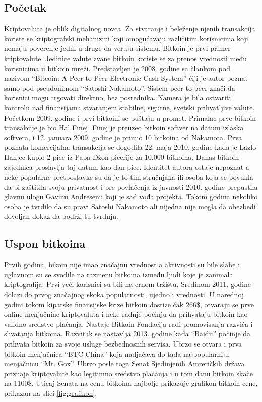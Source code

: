 \documentclass[a4paper]{article}
\begin{document}
\subsection{Početak}
Kriptovaluta je oblik digitalnog novca. Za stvaranje i beleženje njenih transakcija koriste se kriptografski mehanizmi koji omogućavaju različitim korisnicima koji nemaju poverenje jedni u druge da veruju sistemu. Bitkoin je prvi primer kriptovalute. Jedinice valute zvane bitkoin koriste  se za prenos vrednosti među korisnicima u bitkoin mreži. Predstavljen je 2008. godine sa člankom pod nazivom ``Bitcoin: A Peer-to-Peer Electronic Cash System'' čiji je autor poznat samo pod pseudonimom  ``Satoshi Nakamoto''. Sistem peer-to-peer znači da korisnici mogu trgovati direktno, bez posrednika. Namera je bila ostvariti kontrolu nad finansijama stvaranjem stabilne, sigurne, svetski prihvatljive valute. 
Početkom 2009. godine i prvi bitkoini se puštaju u promet. Primalac prve bitkoin transakcije je bio Hal Finej. Finej je preuzeo bitkoin softver na datum izlaska softvera, i 12. januara 2009. godine je primio 10 bitkoina od Nakamota. \cite{istorija} Prva poznata komercijalna transakcija se dogodila 22. maja 2010. godine kada je Lazlo Hanjec kupio 2 pice iz Papa Džon picerije za 10,000 bitkoina. Danas bitkoin zajednica proslavlja taj datum kao dan pice. 
Identitet autora ostaje nepoznat a neke popularne pretpostavke su da je to tim stručnjaka  ili osoba koja se povukla da bi zaštitila svoju privatnost i pre povlačenja iz javnosti 2010. godine prepustila glavnu ulogu Gavinu Andresenu koji je sad vođa projekta. Tokom godina nekoliko osoba je tvrdilo da su pravi Satoshi Nakamoto ali nijedna nije mogla da obezbedi dovoljan dokaz da podrži tu tvrdnju.

\subsection{Uspon bitkoina}
Prvih godina, bikoin nije imao značajnu vrednost a aktivnosti su bile slabe i uglavnom su se svodile na razmenu bitkoina između ljudi koje je zanimala kriptografija. Prvi veći korisnici su bili na crnom tržištu. Sredinom 2011. godine dolazi do prvog značajnog skoka popularnosti, ujedno i vrednosti. U narednoj godini tokom kiparske finansijske krize bitkoin dostize čak 266\$, otvaraju se prve online menjačnine kriptovaluta i neke radnje počinju da prihvataju bitkoin kao validno sredstvo plaćanja. Nastaje Bitkoin Fondacija radi promovisanja razvića i shvatanja bitkoina. Razvitak se nastavlja 2013. godine kada ``Baidu'' počinje da prihvata bitkoin za svoje usluge bezbednosnih servisa. Ubrzo se otvara i prva bitkoin menjačnica ``BTC China'' koja nadjačava do tada najpopularniju menjačnicu ``Mt. Gox''. Ubrzo posle toga Senat Sjedinjenih Amreričkih država priznaje kriptovalute kao legitimno sredstvo plaćanja i u tom danu bitkoin skače na 1100\$. Uticaj Senata na cenu bitkoina najbolje prikazuje grafikon bitkoin cene, prikazan na slici \ref{fig:grafikon}.
\end{document}
